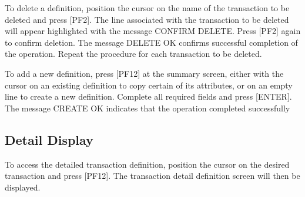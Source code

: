 \documentclass[letterpaper,10pt,english]{sphinxmanual}
\begin{document}
\sphinxAtStartPar
{} \sphinxhyphen{} To delete a definition, position the cursor on the name of the transaction to be deleted and press {[}PF2{]}. The line associated with the transaction to be deleted will appear highlighted with the message CONFIRM DELETE. Press {[}PF2{]} again to confirm deletion. The message DELETE OK confirms successful completion of the operation. Repeat the procedure for each transaction to be deleted.

\sphinxAtStartPar
{} \sphinxhyphen{} To add a new definition, press {[}PF12{]} at the summary screen, either with the cursor on an existing definition to copy certain of its attributes, or on an empty line to create a new definition. Complete all required fields and press {[}ENTER{]}. The message CREATE OK indicates that the operation completed successfully

\ignorespaces 

\subsection{Detail Display}
\label{\detokenize{connectivity_guide:index-117}}\label{\detokenize{connectivity_guide:id66}}
\sphinxAtStartPar
To access the detailed transaction definition, position the cursor on the desired transaction and press {[}PF12{]}. The transaction detail definition screen will then be displayed.

\sphinxAtStartPar
{}

\sphinxAtStartPar
{}

\ignorespaces 
\end{document}
